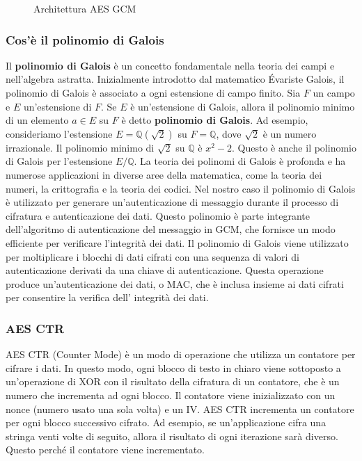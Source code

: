 \begin{figure}[h]
    \centering
    
    \caption{Architettura AES GCM}
    \label{fig:AES-GCM-diagramma}
\end{figure}

\subsubsection{Cos'è il polinomio di Galois}
Il \textbf{polinomio di Galois} è un concetto fondamentale nella teoria dei campi e nell'algebra astratta. Inizialmente introdotto dal matematico Évariste Galois, il polinomio di Galois è associato a ogni estensione di campo finito.
Sia $F$ un campo e $E$ un'estensione di $F$. Se $E$ è un'estensione di Galois, allora il polinomio minimo di un elemento $a \in E$ su $F$ è detto \textbf{polinomio di Galois}.
Ad esempio, consideriamo l'estensione $E = \mathbb{Q}(\sqrt{2})$ su $F = \mathbb{Q}$, dove $\sqrt{2}$ è un numero irrazionale. Il polinomio minimo di $\sqrt{2}$ su $\mathbb{Q}$ è $x^2 - 2$. Questo è anche il polinomio di Galois per l'estensione $E/\mathbb{Q}$.
La teoria dei polinomi di Galois è profonda e ha numerose applicazioni in diverse aree della matematica, come la teoria dei numeri, la crittografia e la teoria dei codici.
Nel nostro caso il polinomio di Galois è utilizzato per generare un'autenticazione di messaggio durante il processo di cifratura e autenticazione dei dati. Questo polinomio è parte integrante dell'algoritmo di autenticazione del messaggio in GCM, che fornisce un modo efficiente per verificare l'integrità dei dati.
Il polinomio di Galois viene utilizzato per moltiplicare i blocchi di dati cifrati con una sequenza di valori di autenticazione derivati da una chiave di autenticazione. Questa operazione produce un'autenticazione dei dati, o MAC, che è inclusa insieme ai dati cifrati per consentire la verifica dell' integrità dei dati.

\subsubsection{AES CTR}
AES CTR (Counter Mode) è un modo di operazione che utilizza un contatore per cifrare i dati. In questo modo, ogni blocco di testo in chiaro viene sottoposto a un’operazione di XOR con il risultato della cifratura di un contatore, che è un numero che incrementa ad ogni blocco. Il contatore viene inizializzato con un nonce (numero usato una sola volta) e un IV. AES CTR incrementa un contatore per ogni blocco successivo cifrato. Ad esempio, se un’applicazione cifra una stringa venti volte di seguito, allora il risultato di ogni iterazione sarà diverso. Questo perché il contatore viene incrementato.

